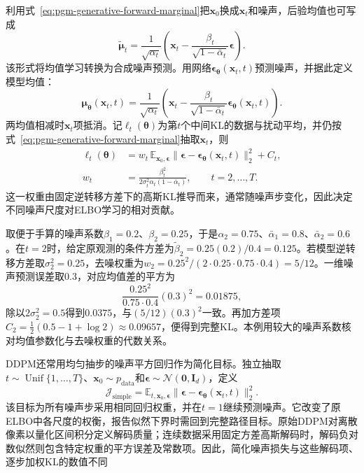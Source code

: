 利用式~\eqref{eq:pgm-generative-forward-marginal}把$\bm{x}_0$换成$\bm{x}_t$和噪声，后验均值也可写成
\[
  \widetilde{\bm{\mu}}_t
  =\frac{1}{\sqrt{\alpha_t}}
       \left(\bm{x}_t-
          \frac{\beta_t}{\sqrt{1-\bar{\alpha}_t}}\bm{\epsilon}\right).
\]
该形式将均值学习转换为合成噪声预测。用网络$\bm{\epsilon}_{\bm{\theta}}(\bm{x}_t,t)$预测噪声，并据此定义模型均值：
\begin{equation}
  \label{eq:pgm-generative-noise-parameterization}
  \bm{\mu}_{\bm{\theta}}(\bm{x}_t,t)
  =\frac{1}{\sqrt{\alpha_t}}
       \left(\bm{x}_t-
          \frac{\beta_t}{\sqrt{1-\bar{\alpha}_t}}
               \bm{\epsilon}_{\bm{\theta}}(\bm{x}_t,t)\right).
\end{equation}
两均值相减时$\bm{x}_t$项抵消。记$\ell_t(\bm{\theta})$为第$t$个中间KL的数据与扰动平均，并仍按式~\eqref{eq:pgm-generative-forward-marginal}抽取$\bm{x}_t$，则
\begin{equation}
  \label{eq:pgm-generative-weighted-denoising}
  \begin{aligned}
    \ell_t(\bm{\theta})
      &=w_t\,\mathbb{E}_{\bm{x}_0,\bm{\epsilon}}
         \lVert\bm{\epsilon}
          -\bm{\epsilon}_{\bm{\theta}}(\bm{x}_t,t)\rVert_2^2+C_t,\\
    w_t&=\frac{\beta_t^2}
              {2\sigma_t^2\alpha_t(1-\bar{\alpha}_t)},
          \qquad t=2,\ldots,T.
  \end{aligned}
\end{equation}
这一权重由固定逆转移方差下的高斯KL推导而来，通常随噪声步变化，因此决定不同噪声尺度对ELBO学习的相对贡献。

\begin{example}[核对一个扩散步的权重]
  \label{ex:pgm-generative-step-weight}
  取便于手算的噪声系数$\beta_1=0.2$、$\beta_2=0.25$，于是$\alpha_2=0.75$、$\bar{\alpha}_1=0.8$、$\bar{\alpha}_2=0.6$。在$t=2$时，给定原观测的条件方差为$\widetilde{\beta}_2=0.25(0.2)/0.4=0.125$。若模型逆转移方差取$\sigma_2^2=0.25$，去噪权重为$w_2=0.25^2/(2\cdot0.25\cdot0.75\cdot0.4)=5/12$。一维噪声预测误差取$0.3$，对应均值差的平方为
  \[
    \frac{0.25^2}{0.75\cdot0.4}(0.3)^2=0.01875,
  \]
  除以$2\sigma_2^2=0.5$得到$0.0375$，与$(5/12)(0.3)^2$一致。再加方差项$C_2=\tfrac12(0.5-1+\log2)\approx0.09657$，便得到完整KL。本例用较大的噪声系数核对均值参数化与去噪权重的代数关系。
\end{example}

DDPM还常用均匀抽步的噪声平方回归作为简化目标。独立抽取$t\sim\operatorname{Unif}\{1,\ldots,T\}$、$\bm{x}_0\sim p_{\mathrm{data}}$和$\bm{\epsilon}\sim\mathcal{N}(\bm{0},\bm{I}_d)$，定义
\begin{equation}
  \label{eq:pgm-generative-simple-loss}
  \mathcal{J}_{\mathrm{simple}}
  =\mathbb{E}_{t,\bm{x}_0,\bm{\epsilon}}
      \lVert\bm{\epsilon}
       -\bm{\epsilon}_{\bm{\theta}}(\bm{x}_t,t)\rVert_2^2.
\end{equation}
该目标为所有噪声步采用相同回归权重，并在$t=1$继续预测噪声。它改变了原ELBO中各尺度的权衡，报告似然下界时需回到完整路径目标。原始DDPM对离散像素以量化区间积分定义解码质量；连续数据采用固定方差高斯解码时，解码负对数似然则包含特定权重的平方误差及常数项。因此，简化噪声损失与这些解码项、逐步加权KL的数值不同

